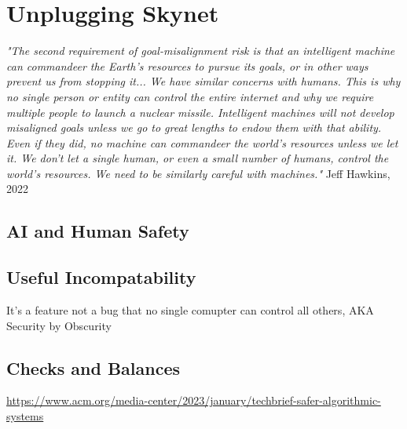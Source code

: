 \setchapterpreamble[u]{\margintoc}
\chapter{Unplugging Skynet}

\textit{"The second requirement of goal-misalignment risk is that an intelligent machine can commandeer the Earth's resources to pursue its goals, or in other ways prevent us from stopping it... We have similar concerns with humans. This is why no single person or entity can control the entire internet and why we require multiple people to launch a nuclear missile. Intelligent machines will not develop misaligned goals unless we go to great lengths to endow them with that ability. Even if they did, no machine can commandeer the world's resources unless we let it. We don't let a single human, or even a small number of humans, control the world's resources. We need to be similarly careful with machines."} Jeff Hawkins, 2022 \cite{hawkins2022}

\section{AI and Human Safety}

\section{Useful Incompatability}

It's a feature not a bug that no single comupter can control all others, AKA Security by Obscurity

\section{Checks and Balances}

\url{https://www.acm.org/media-center/2023/january/techbrief-safer-algorithmic-systems}
